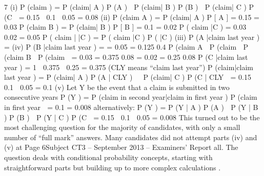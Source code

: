 \documentclass[a4paper,12pt]{article}
\begin{document}
\begin{enumerate}
7
(i)
P (claim ) = P (claim| A ) P (A )  P (claim| B ) P (B )  P (claim| C ) P (C 
= 0.15   0.1   0.05   =  0.08
(ii)
P (claim \cup A )  =  P (claim| A ) P [ A ]  =  0.15   =  0.03
P (claim \cup B )  =  P (claim| B ) P [ B ]  =  0.1   =  0.02
P ( claim \cup \bar{C} )  =  0.03  0.02  =  0.05
P ( claim | \bar{C} )  = 
P ( claim \cup \bar{C} )
P ( \bar{C} )
(iii) P (A |claim last year )  = 
(iv) P (B |claim last year )  = 
 = 
0.05
 =  0.125
0.4
P (claim \cup A 
P (claim 
P (claim \cup B 
P (claim 
 =  0.03
 =  0.375
0.08
 =  0.02
 =  0.25
0.08
P (C |claim last year )  =  1  0.375  0.25  =  0.375
(CLY means “claim last year”)
P (claim|claim last year ) = P (claim| A ) P (A | CLY )  P (claim| C ) P (C | CLY 
 =  0.15   0.1   0.05   =  0.1
(v)
Let Y be the event that a claim is submitted in two consecutive years
P (Y )  =  P (claim in second year|claim in first year ) P (claim in first year 
 =  0.1   =  0.008
alternatively:
P (Y ) = P (Y | A ) P (A )  P (Y | B ) P (B )  P (Y | C ) P (C 
= 0.15    0.1    0.05    =  0.008
This turned out to be the most challenging question for the majority of candidates, with only
a small number of “full mark” answers. Many candidates did not attempt parts (iv) and (v) at
Page 6Subject CT3 – September 2013 – Examiners’ Report
all. The question deals with conditional probability concepts, starting with straightforward
parts but building up to more complex calculations .
\end{enumerate}
\end{document}
